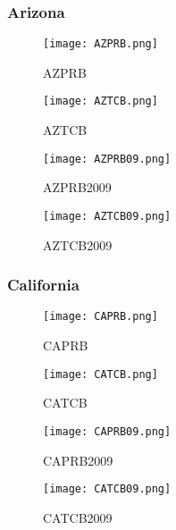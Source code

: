 \documentclass{mcmthesis}
\begin{document}
\subsubsection{Arizona}
\begin{figure}[H]
\begin{minipage}[htb]{0.5\textwidth}
\centering
\texttt{[image: AZPRB.png]}
\caption{AZPRB} \label{fig:AZPRB}
\end{minipage}
\begin{minipage}[htb]{0.5\textwidth}
\centering
\texttt{[image: AZTCB.png]}
\caption{AZTCB} \label{fig:AZTCB}
\end{minipage}
\end{figure}

\begin{figure}[H]
\begin{minipage}[htb]{0.5\textwidth}
\centering
\texttt{[image: AZPRB09.png]}
\caption{AZPRB2009} \label{fig:AZPRB2009}
\end{minipage}
\begin{minipage}[htb]{0.5\textwidth}
\centering
\texttt{[image: AZTCB09.png]}
\caption{AZTCB2009} \label{fig:AZTCB2009}
\end{minipage}
\end{figure}


\subsubsection{California}
\begin{figure}[H]
\begin{minipage}[htb]{0.5\textwidth}
\centering
\texttt{[image: CAPRB.png]}
\caption{CAPRB} \label{fig:CAPRB}
\end{minipage}
\begin{minipage}[htb]{0.5\textwidth}
\centering
\texttt{[image: CATCB.png]}
\caption{CATCB} \label{fig:CATCB}
\end{minipage}
\end{figure}

\begin{figure}[H]
\begin{minipage}[htb]{0.5\textwidth}
\centering
\texttt{[image: CAPRB09.png]}
\caption{CAPRB2009} \label{fig:CAPRB2009}
\end{minipage}
\begin{minipage}[htb]{0.5\textwidth}
\centering
\texttt{[image: CATCB09.png]}
\caption{CATCB2009} \label{fig:CATCB2009}
\end{minipage}
\end{figure}
\end{document}

